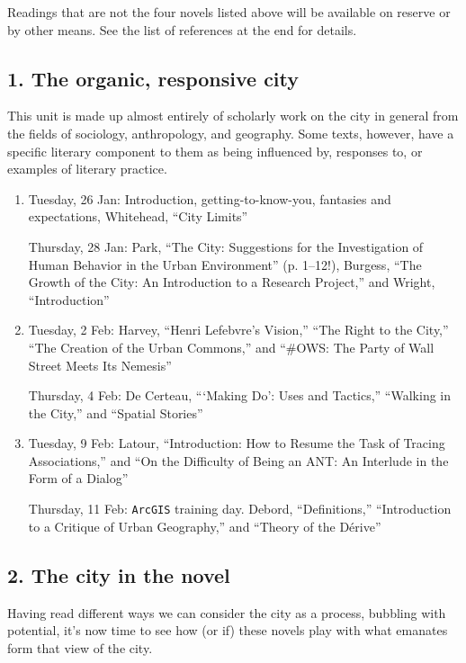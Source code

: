 Readings that are not the four novels listed above will be available on reserve
or by other means. See the list of references at the end for details.

\subsection*{1. The organic, responsive city}

  This unit is made up almost entirely of scholarly work on the city in general
  from the fields of sociology, anthropology, and geography. Some texts,
  however, have a specific literary component to them as being influenced by,
  responses to, or examples of literary practice. 

\begin{enumerate}

  \item Tuesday, 26 Jan: Introduction, getting-to-know-you, fantasies and expectations,
    Whitehead, “City Limits”

    Thursday, 28 Jan: Park, “The City: Suggestions for the Investigation of Human Behavior in the Urban Environment” (p. 1--12!), Burgess, “The Growth of the City: An Introduction to a Research Project,” and Wright, “Introduction”

  \item Tuesday, 2 Feb: Harvey, “Henri Lefebvre’s Vision,” “The Right to the City,” “The Creation of the Urban Commons,” and “\#OWS: The Party of Wall Street Meets Its Nemesis”

    Thursday, 4 Feb: De Certeau, “‘Making Do’: Uses and Tactics,” “Walking in the City,” and “Spatial Stories”

  \item Tuesday, 9 Feb: Latour, “Introduction: How to Resume the Task of Tracing Associations,” and “On the Difficulty of Being an ANT: An Interlude in the Form of a Dialog”

    Thursday, 11 Feb: \texttt{ArcGIS} training day. Debord, “Definitions,” “Introduction to a Critique of Urban Geography,” and “Theory of the Dérive”

\end{enumerate}

\subsection*{2. The city in the novel}

Having read different ways we can consider the city as a process, bubbling with
potential, it’s now time to see how (or if) these novels play with what
emanates form that view of the city.

